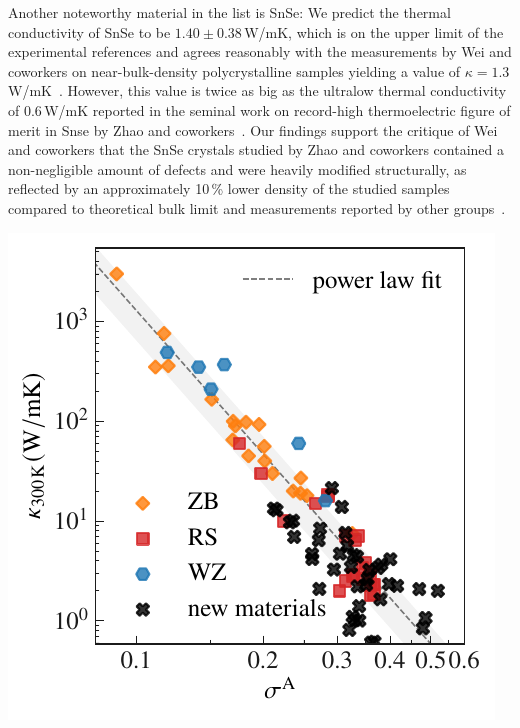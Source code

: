 Another noteworthy material in the list is SnSe: We predict the thermal conductivity of SnSe to be $1.40 \pm 0.38$\,W/mK, which is on the upper limit of the experimental references and agrees reasonably with the measurements by Wei and coworkers on near-bulk-density polycrystalline samples yielding a value of $\kappa = 1.3$\,W/mK~\cite{Wei.2016}.
However, this value is twice as big as the ultralow thermal conductivity of $0.6$\,W/mK reported in the seminal work on record-high thermoelectric figure of merit in Snse by Zhao and coworkers~\cite{Zhao.2014}. Our findings support the critique of Wei and coworkers that the SnSe crystals studied by Zhao and coworkers contained a non-negligible amount of defects and were heavily modified structurally, as reflected by an approximately 10\,\% lower density of the studied samples compared to theoretical bulk limit and measurements reported by other groups~\cite{Wei.2016}.
%
\begin{marginfigure}
	\includegraphics[width=\textwidth]{./data/plots/anharmonicity/9_kappa/incl_computations/sigma_vs_kappa_annot_comp_margin.pdf}
	\caption{
	Thermal conductivity at room temperature vs. anharmonicity measure. ZB: zincblende, RS: rock salt, WZ: wurtzite, cf. Fig.\,\ref{fig:anh.kappa}.}
	\label{fig:kappa_sigma_exp_comp}
\end{marginfigure}
